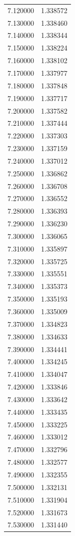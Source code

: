 \begin{tabular}{rr}
7.120000 & 1.338572 \\
7.130000 & 1.338460 \\
7.140000 & 1.338344 \\
7.150000 & 1.338224 \\
7.160000 & 1.338102 \\
7.170000 & 1.337977 \\
7.180000 & 1.337848 \\
7.190000 & 1.337717 \\
7.200000 & 1.337582 \\
7.210000 & 1.337444 \\
7.220000 & 1.337303 \\
7.230000 & 1.337159 \\
7.240000 & 1.337012 \\
7.250000 & 1.336862 \\
7.260000 & 1.336708 \\
7.270000 & 1.336552 \\
7.280000 & 1.336393 \\
7.290000 & 1.336230 \\
7.300000 & 1.336065 \\
7.310000 & 1.335897 \\
7.320000 & 1.335725 \\
7.330000 & 1.335551 \\
7.340000 & 1.335373 \\
7.350000 & 1.335193 \\
7.360000 & 1.335009 \\
7.370000 & 1.334823 \\
7.380000 & 1.334633 \\
7.390000 & 1.334441 \\
7.400000 & 1.334245 \\
7.410000 & 1.334047 \\
7.420000 & 1.333846 \\
7.430000 & 1.333642 \\
7.440000 & 1.333435 \\
7.450000 & 1.333225 \\
7.460000 & 1.333012 \\
7.470000 & 1.332796 \\
7.480000 & 1.332577 \\
7.490000 & 1.332355 \\
7.500000 & 1.332131 \\
7.510000 & 1.331904 \\
7.520000 & 1.331673 \\
7.530000 & 1.331440 \\

\end{tabular}

